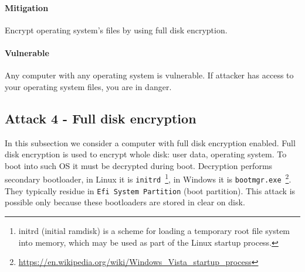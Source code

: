 \paragraph*{Mitigation}
Encrypt operating system's files by using full disk encryption.

\paragraph*{Vulnerable}
Any computer with any operating system is vulnerable. If attacker has access to your operating system files, you are in danger.


\subsection{Attack 4 - Full disk encryption}
In this subsection we consider a computer with full disk encryption enabled. Full disk encryption is used to encrypt whole disk: user data, operating system. To boot into such OS it must be decrypted during boot. Decryption performs secondary bootloader, in Linux it is \texttt{initrd}~\footnote{initrd (initial ramdisk) is a scheme for loading a temporary root file system into memory, which may be used as part of the Linux startup process.}, in Windows it is \texttt{bootmgr.exe}~\footnote{\url{https://en.wikipedia.org/wiki/Windows_Vista_startup_process}}. They typically residue in \texttt{Efi System Partition} (boot partition). This attack is possible only because these bootloaders are stored in clear on disk.

